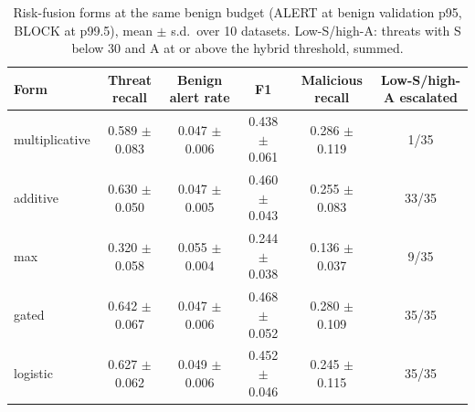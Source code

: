 \begin{table}[t]
\centering
\scriptsize
\caption{Risk-fusion forms at the same benign budget (ALERT at benign validation p95, BLOCK at p99.5), mean $\pm$ s.d.\ over 10 datasets. Low-S/high-A: threats with S below 30 and A at or above the hybrid threshold, summed.}
\label{tab:fusion}
\begin{tabular}{lccccc}
\hline
Form & Threat recall & Benign alert rate & F1 & Malicious recall & Low-S/high-A escalated \\
\hline
multiplicative & 0.589 $\pm$ 0.083 & 0.047 $\pm$ 0.006 & 0.438 $\pm$ 0.061 & 0.286 $\pm$ 0.119 & 1/35 \\
additive & 0.630 $\pm$ 0.050 & 0.047 $\pm$ 0.005 & 0.460 $\pm$ 0.043 & 0.255 $\pm$ 0.083 & 33/35 \\
max & 0.320 $\pm$ 0.058 & 0.055 $\pm$ 0.004 & 0.244 $\pm$ 0.038 & 0.136 $\pm$ 0.037 & 9/35 \\
gated & 0.642 $\pm$ 0.067 & 0.047 $\pm$ 0.006 & 0.468 $\pm$ 0.052 & 0.280 $\pm$ 0.109 & 35/35 \\
logistic & 0.627 $\pm$ 0.062 & 0.049 $\pm$ 0.006 & 0.452 $\pm$ 0.046 & 0.245 $\pm$ 0.115 & 35/35 \\
\hline
\end{tabular}
\end{table}
